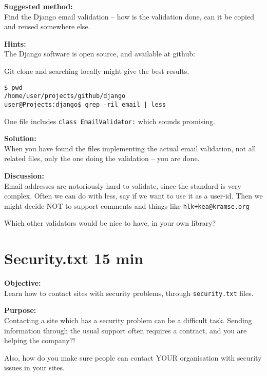 \documentclass[a4paper,11pt,notitlepage]{report}
\begin{document}
{\bf Suggested method:}\\
Find the Django email validation -- how is the validation done, can it be copied and reused somewhere else.

{\bf Hints:}\\
The Django software is open source, and available at github:\\

Git clone and searching locally might give the best results.

\begin{verbatim}
$ pwd
/home/user/projects/github/django
user@Projects:django$ grep -ril email | less
\end{verbatim}

One file includes \verb+class EmailValidator:+ which sounds promising.


{\bf Solution:}\\
When you have found the files implementing the actual email validation, not all related files, only the one doing the validation -- you are done.

{\bf Discussion:}\\
Email addresses are notoriously hard to validate, since the standard is very complex. Often we can do with less, say if we want to use it as a user-id. Then we might decide NOT to support comments and things like \verb?hlk+kea@kramse.org?

Which other validators would be nice to have, in your own library?




\chapter{Security.txt 15 min}
\label{ex:security.txt}

{\bf Objective:}\\
Learn how to contact sites with security problems, through \verb+security.txt+ files.



{\bf Purpose:}\\
Contacting a site which has a security problem can be a difficult task. Sending information through the usual support often requires a contract, and you are helping the company?!

Also, how do you make sure people can contact YOUR organisation with security issues in your sites.
\end{document}
